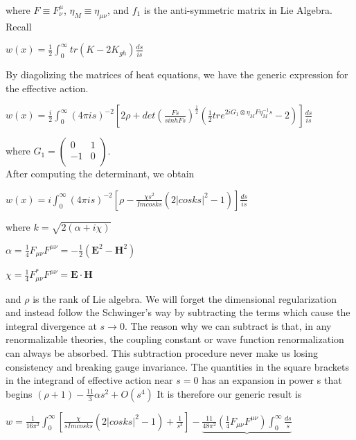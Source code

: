 \documentclass[a4paper,12 pt]{article}
\begin{document}
where $ F \equiv F^{\mu}_{\nu}$, $ \eta_{M}\equiv \eta_{\mu\nu} $,
and $ f_{1}$ is the anti-symmetric matrix in Lie Algebra. Recall
\begin{center}
 $ w(x) = \frac{1}{2}\int_{0}^{\infty}tr (K- 2
 K_{gh})\frac{ds}{is} $
\end{center}
By diagolizing the matrices of heat equations, we have the generic
expression for the effective action.
\begin{center}
$ w(x) = \frac{i}{2} \int_{0}^{\infty}(4 \pi i s)^{-2}[2\rho +
det(\frac{F s}{sinh Fs})^{\frac{1}{2}}(\frac{1}{2}tr e^{2i
G_{1}\otimes\eta_{M}F\eta_{M}^{-1}s}-2)]\frac{ds}{is}$
\end{center}
where $ G_{1} = \left(%
\begin{array}{cc}
  0 & 1 \\
  -1 & 0 \\
\end{array}%
\right)$.\\
 After computing the determinant, we obtain
\begin{center}
$ w(x) = i \int_{0}^{\infty}(4 \pi i s)^{-2}[\rho - \frac{\chi
s^{2}}{Im cosks}(2 |cosks|^{2}-1)]\frac{ds}{is}$
\end{center}
where $ k = \sqrt{2(\alpha + i\chi)}$
\begin{center}
$\alpha  =  \frac{1}{4}F_{\mu\nu}F^{\mu\nu}  =
-\frac{1}{2}(\textbf{E}^{2}-\textbf{H}^{2})$
\end{center}


\begin{center}
$\chi =  \frac{1}{4}F_{\mu\nu}^{*}F^{\mu\nu}  =  \textbf{E} \cdot
\textbf{H} $
\end{center}
and $ \rho $ is the rank of Lie algebra.
 We will forget the dimensional regularization and instead
follow the Schwinger's way by subtracting the terms which cause
the integral divergence at $s \rightarrow 0$. The reason why we
can subtract is that, in any renormalizable theories, the coupling
constant or wave function renormalization can always be absorbed.
This subtraction procedure never make us losing consistency and
breaking gauge invariance. The quantities in the square brackets
in the integrand of effective action near $ s=0 $ has an expansion
in power s that begins $ (\rho+1) - \frac{11}{3}\alpha s^{2} +
O(s^{4})$ It is therefore our generic result is
\begin{center}
$ w = \frac{1}{16 \pi^{2}}\int_{0}^{\infty}[\frac{\chi}{s Im
cosks}(2|cosks|^{2}-1)+\frac{1}{s^{3}}]-\underbrace{\frac{11}{48
\pi^{2}}(\frac{1}{4}F_{\mu\nu}F^{\mu\nu})\int_{0}^{\infty}\frac{ds}{s}}$
\end{center}
\end{document}
